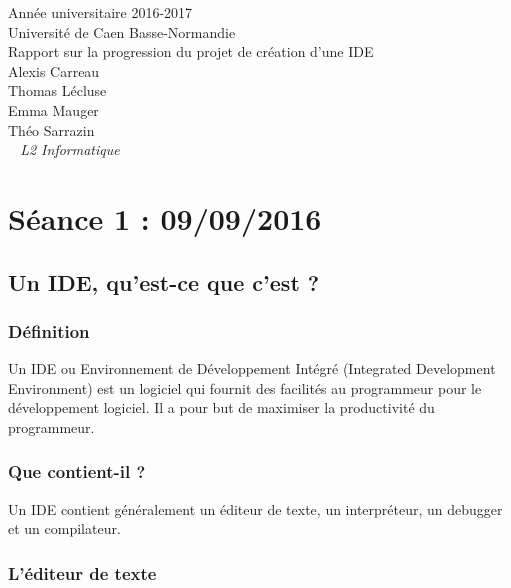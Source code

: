 \documentclass[a4paper,12pt]{article}
\begin{document}
\begin{titlepage}
	\begin{center}
		\Large{Année universitaire 2016-2017}\\
		\Large{Université de Caen Basse-Normandie}\\[1cm]
		
		\huge{Rapport sur la progression du projet de création d'une IDE}\\
		\vspace{3cm}
		Alexis Carreau\\
		Thomas Lécluse\\
		Emma Mauger\\
		Théo Sarrazin\\
	\normalsize{\textit{ ~ L2 Informatique}}\\
		\medskip
		\vspace{2cm}
		
	\end{center}
\end{titlepage}

\tableofcontents
\newpage

\section{Séance 1 : 09/09/2016}

\subsection{Un IDE, qu'est-ce que c'est ?}

\subsubsection{Définition}

Un  IDE   ou  Environnement   de  Développement   Intégré  (Integrated
Development Environment) est un logiciel  qui fournit des facilités au
programmeur pour le développement logiciel. Il a pour but de maximiser
la productivité du programmeur.

\subsubsection{Que contient-il ?}

Un IDE contient généralement un  éditeur de texte, un interpréteur, un
debugger et un compilateur.

\subsubsection*{L'éditeur de texte}
\end{document}

